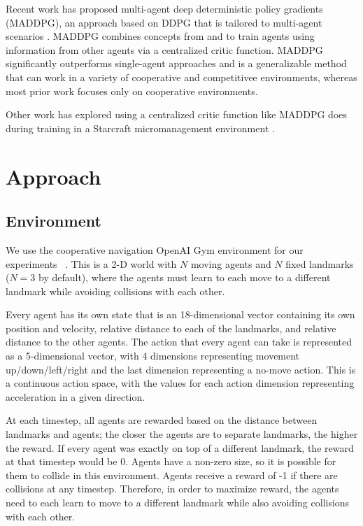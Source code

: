 \documentclass{article}
\begin{document}
Recent work has proposed multi-agent deep deterministic policy gradients (MADDPG), an approach based on DDPG that is tailored to multi-agent scenarios \cite{maddpg}. MADDPG combines concepts from \cite{suttonbarto1998rl} and \cite{lillicrap2015continuous} to train agents using information from other agents via a centralized critic function. MADDPG significantly outperforms single-agent approaches and is a generalizable method that can work in a variety of cooperative and competitivee environments, whereas most prior work focuses only on cooperative environments.

Other work has explored using a centralized critic function like MADDPG does during training in a Starcraft micromanagement environment \cite{coma}.

\section{Approach}

\subsection{Environment}

We use the cooperative navigation OpenAI Gym environment for our experiments ~\cite{openaigym}. This is a 2-D world with $N$ moving agents and $N$ fixed landmarks ($N=3$ by default), where the agents must learn to each move to a different landmark while avoiding collisions with each other.

Every agent has its own state that is an 18-dimensional vector containing its own position and velocity, relative distance to each of the landmarks, and relative distance to the other agents. The action that every agent can take is represented as a 5-dimensional vector, with 4 dimensions representing movement up/down/left/right and the last dimension representing a no-move action. This is a continuous action space, with the values for each action dimension representing acceleration in a given direction.

At each timestep, all agents are rewarded based on the distance between landmarks and agents; the closer the agents are to separate landmarks, the higher the reward. If every agent was exactly on top of a different landmark, the reward at that timestep would be 0. Agents have a non-zero size, so it is possible for them to collide in this environment. Agents receive a reward of -1 if there are collisions at any timestep. Therefore, in order to maximize reward, the agents need to each learn to move to a different landmark while also avoiding collisions with each other.
\end{document}
